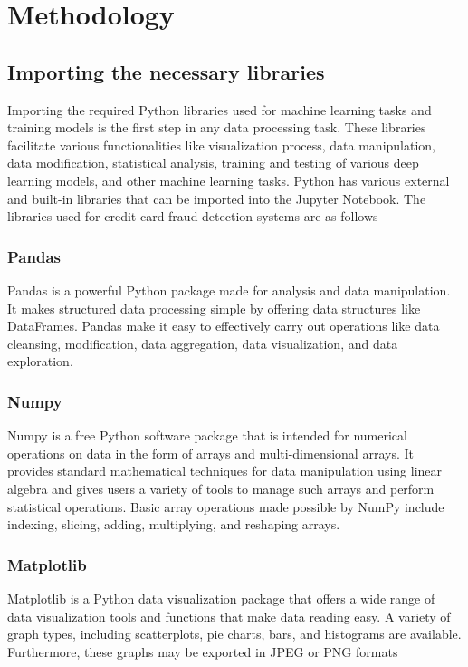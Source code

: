 \chapter{Methodology}
\label{ch:method} %

\section{Importing the necessary libraries}

Importing the required Python libraries used for machine learning tasks and training models is the first step in any data processing task. These libraries facilitate various functionalities like visualization process, data manipulation, data modification, statistical analysis, training and testing of various deep learning models, and other machine learning tasks. Python has various external and built-in libraries that can be imported into the Jupyter Notebook. The libraries used for credit card fraud detection systems are as follows -

\subsection{Pandas}
Pandas is a powerful Python package made for analysis and data manipulation. It makes structured data processing simple by offering data structures like DataFrames. Pandas make it easy to effectively carry out operations like data cleansing, modification, data aggregation, data visualization, and data exploration.

\subsection{Numpy}
Numpy is a free Python software package that is intended for numerical operations on data in the form of arrays and multi-dimensional arrays. It provides standard mathematical techniques for data manipulation using linear algebra and gives users a variety of tools to manage such arrays and perform statistical operations. Basic array operations made possible by NumPy include indexing, slicing, adding, multiplying, and reshaping arrays.

\subsection{Matplotlib}
Matplotlib is a  Python data visualization package that offers a wide range of data visualization tools and functions that make data reading easy. A variety of graph types, including scatterplots, pie charts, bars, and histograms are available. Furthermore, these graphs may be exported in JPEG or PNG formats

